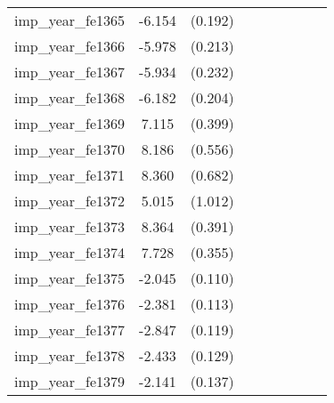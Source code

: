 {\begin{tabular}{l*{4}{cc}}
imp\_year\_fe1365&   -6.154\sym{***}&  (0.192)&                  &         &                  &         &                  &         \\
imp\_year\_fe1366&   -5.978\sym{***}&  (0.213)&                  &         &                  &         &                  &         \\
imp\_year\_fe1367&   -5.934\sym{***}&  (0.232)&                  &         &                  &         &                  &         \\
imp\_year\_fe1368&   -6.182\sym{***}&  (0.204)&                  &         &                  &         &                  &         \\
imp\_year\_fe1369&    7.115\sym{***}&  (0.399)&                  &         &                  &         &                  &         \\
imp\_year\_fe1370&    8.186\sym{***}&  (0.556)&                  &         &                  &         &                  &         \\
imp\_year\_fe1371&    8.360\sym{***}&  (0.682)&                  &         &                  &         &                  &         \\
imp\_year\_fe1372&    5.015\sym{***}&  (1.012)&                  &         &                  &         &                  &         \\
imp\_year\_fe1373&    8.364\sym{***}&  (0.391)&                  &         &                  &         &                  &         \\
imp\_year\_fe1374&    7.728\sym{***}&  (0.355)&                  &         &                  &         &                  &         \\
imp\_year\_fe1375&   -2.045\sym{***}&  (0.110)&                  &         &                  &         &                  &         \\
imp\_year\_fe1376&   -2.381\sym{***}&  (0.113)&                  &         &                  &         &                  &         \\
imp\_year\_fe1377&   -2.847\sym{***}&  (0.119)&                  &         &                  &         &                  &         \\
imp\_year\_fe1378&   -2.433\sym{***}&  (0.129)&                  &         &                  &         &                  &         \\
imp\_year\_fe1379&   -2.141\sym{***}&  (0.137)&                  &         &                  &         &                  &         \\

\end{tabular}}
